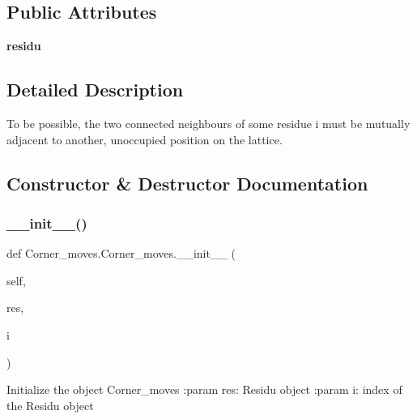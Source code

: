 \subsection*{Public Attributes}
\begin{DoxyCompactItemize}
\item 
\mbox{\label{classCorner__moves_1_1Corner__moves_a306f0fe66fe24b76781a5e24128d8fb6}} 
{\bfseries residu}
\end{DoxyCompactItemize}


\subsection{Detailed Description}
\begin{DoxyVerb}To be possible, the two connected neighbours of some residue i must
    be mutually adjacent to another, unoccupied position on the lattice.
\end{DoxyVerb}
 

\subsection{Constructor \& Destructor Documentation}
\mbox{\label{classCorner__moves_1_1Corner__moves_af74a6a204959ce19e1f9a10a8b4c8000}} 
\subsubsection{\texorpdfstring{\+\_\+\+\_\+init\+\_\+\+\_\+()}{\_\_init\_\_()}}
{\footnotesize\ttfamily def Corner\+\_\+moves.\+Corner\+\_\+moves.\+\_\+\+\_\+init\+\_\+\+\_\+ (\begin{DoxyParamCaption}\item[{}]{self,  }\item[{}]{res,  }\item[{}]{i }\end{DoxyParamCaption})}

\begin{DoxyVerb}Initialize the object Corner_moves
    :param res: Residu object
    :param   i: index of the Residu object
\end{DoxyVerb}
 

